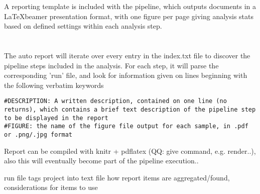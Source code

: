 A reporting template is included with the pipeline, which outputs documents in a \LaTeX beamer presentation format, with one figure per page giving analysis stats based on defined settings within each analysis step. \\
\\
\\
The auto report will iterate over every entry in the index.txt file to discover the pipeline steps included in the analysis. For each step, it will parse the corresponding 'run' file, and look for information given on lines beginning with the following verbatim keywords

\begin{lstlisting}
#DESCRIPTION: A written description, contained on one line (no returns), which contains a brief text description of the pipeline step to be displayed in the report
#FIGURE: the name of the figure file output for each sample, in .pdf or .png/.jpg format
\end{lstlisting}

Report can be compiled with knitr + pdflatex (QQ: give command, e.g. render..), also this will eventually become part of the pipeline execution..



run file tags
project into text file
how report items are aggregated/found, considerations for items to use
